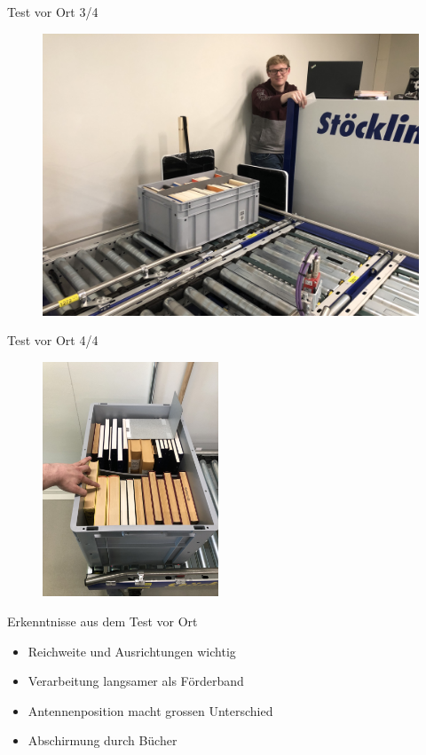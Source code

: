 \documentclass{beamer}
\begin{document}
\begin{frame}{Test vor Ort 3/4}
\begin{figure}[tbh!]
    \centering
    \includegraphics[width=0.8\linewidth]{img/Versuchsaufbau_01}   \label{fig:versuchsaufbau01}
\end{figure}
\end{frame}
\begin{frame}{Test vor Ort 4/4}
\begin{figure}[tbh!]
    \centering
    \includegraphics[height=7cm]{img/PositionNichtLesbarerTag}   \label{fig:PositionNichtLesbarerTag}
\end{figure}
\end{frame}
\begin{frame}{Erkenntnisse aus dem Test vor Ort}
\begin{itemize}
    \item Reichweite und Ausrichtungen wichtig
    \item Verarbeitung langsamer als Förderband
    \item Antennenposition macht grossen Unterschied
    \item Abschirmung durch Bücher
\end{itemize}
\end{frame}
\end{document}
